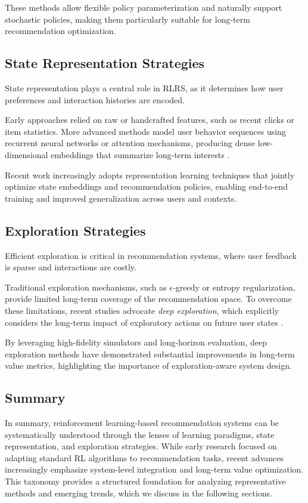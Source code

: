 These methods allow flexible policy parameterization and naturally support stochastic policies, making them particularly suitable for long-term recommendation optimization.

\subsection{State Representation Strategies}

State representation plays a central role in RLRS, as it determines how user preferences and interaction histories are encoded.

Early approaches relied on raw or handcrafted features, such as recent clicks or item statistics. More advanced methods model user behavior sequences using recurrent neural networks or attention mechanisms, producing dense low-dimensional embeddings that summarize long-term interests \cite{Zheng2018DRN}.

Recent work increasingly adopts representation learning techniques that jointly optimize state embeddings and recommendation policies, enabling end-to-end training and improved generalization across users and contexts.

\subsection{Exploration Strategies}

Efficient exploration is critical in recommendation systems, where user feedback is sparse and interactions are costly.

Traditional exploration mechanisms, such as $\epsilon$-greedy or entropy regularization, provide limited long-term coverage of the recommendation space. To overcome these limitations, recent studies advocate \emph{deep exploration}, which explicitly considers the long-term impact of exploratory actions on future user states \cite{Ie2019DeepExploration}.

By leveraging high-fidelity simulators and long-horizon evaluation, deep exploration methods have demonstrated substantial improvements in long-term value metrics, highlighting the importance of exploration-aware system design.

\subsection{Summary}

In summary, reinforcement learning-based recommendation systems can be systematically understood through the lenses of learning paradigms, state representation, and exploration strategies. While early research focused on adapting standard RL algorithms to recommendation tasks, recent advances increasingly emphasize system-level integration and long-term value optimization. This taxonomy provides a structured foundation for analyzing representative methods and emerging trends, which we discuss in the following sections.
